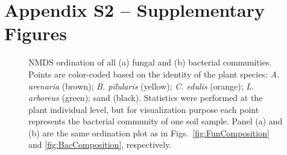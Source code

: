 \section{Appendix S2 -- Supplementary Figures}
\begin{figure}[h]
	\centering
	\caption[NMDS ordination of all (a) fungal and (b) bacterial communities.]
		{\hspace{1mm} 
		NMDS ordination of all (a) fungal and (b) bacterial communities. Points are color-coded based on the identity of the plant species: \textit{A. arenaria} (brown); \textit{B. pilularis} (yellow); \textit{C. edulis} (orange); \textit{L. arboreus} (green); sand (black). 
		Statistics were performed at the plant individual level, but for visualization purpose each point represents the bacterial community of one soil sample. Panel (a) and (b) are the same ordination plot as in Figs.~\ref{fig:FunComposition} and \ref{fig:BacComposition}, respectively.}
	\label{fig:BothComposition}
\end{figure}



